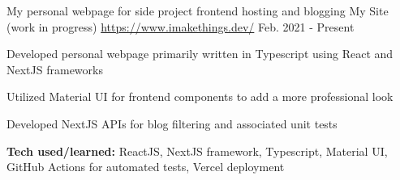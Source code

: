 \begin{cventries}
    \vspace{-.25em}
    \cventry
    {My personal webpage for side project frontend hosting and blogging} %
    {My Site (work in progress)} %
    {\href{https://www.imakethings.dev/}{https://www.imakethings.dev/}} %
    {Feb. 2021 - Present} %
    { %
        \begin{cvitems}
            \item {Developed personal webpage primarily written in Typescript using React and NextJS frameworks}
            \item {Utilized Material UI for frontend components to add a more professional look}
            \item {Developed NextJS APIs for blog filtering and associated unit tests}
            \item {\scriptsize{\textbf{Tech used/learned:} ReactJS, NextJS framework, Typescript, Material UI, GitHub Actions for automated tests, Vercel deployment}}
        \end{cvitems}
    }




\end{cventries}
